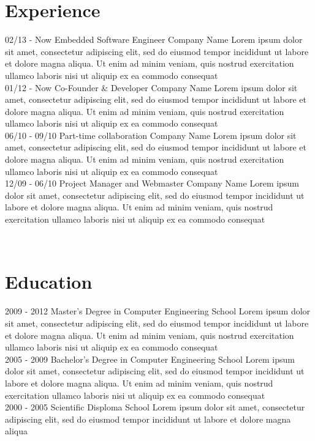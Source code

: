 \documentclass[]{friggeri-cv}
\begin{document}
\section{Experience}
\begin{entrylist}
  \entry
    {02/13 - Now}
    {Embedded Software Engineer}
    {Company Name}
    {Lorem ipsum dolor sit amet, consectetur adipiscing elit, sed do eiusmod tempor incididunt ut labore et dolore magna aliqua. Ut enim ad minim veniam, quis nostrud exercitation ullamco laboris nisi ut aliquip ex ea commodo consequat\\}
  \entry
    {01/12 - Now}
    {Co-Founder \& Developer}
    {Company Name}
    {Lorem ipsum dolor sit amet, consectetur adipiscing elit, sed do eiusmod tempor incididunt ut labore et dolore magna aliqua. Ut enim ad minim veniam, quis nostrud exercitation ullamco laboris nisi ut aliquip ex ea commodo consequat\\}
    \entry
    {06/10 - 09/10}
    {Part-time collaboration}
    {Company Name}
    {Lorem ipsum dolor sit amet, consectetur adipiscing elit, sed do eiusmod tempor incididunt ut labore et dolore magna aliqua. Ut enim ad minim veniam, quis nostrud exercitation ullamco laboris nisi ut aliquip ex ea commodo consequat\\}
    \entry
    {12/09 - 06/10}
    {Project Manager and Webmaster}
    {Company Name}
    {Lorem ipsum dolor sit amet, consectetur adipiscing elit, sed do eiusmod tempor incididunt ut labore et dolore magna aliqua. Ut enim ad minim veniam, quis nostrud exercitation ullamco laboris nisi ut aliquip ex ea commodo consequat}
\end{entrylist}
\\
\section{Education}
\begin{entrylist}
  \entry
    {2009 - 2012}
    {Master's Degree in Computer Engineering}
    {School}
    {Lorem ipsum dolor sit amet, consectetur adipiscing elit, sed do eiusmod tempor incididunt ut labore et dolore magna aliqua. Ut enim ad minim veniam, quis nostrud exercitation ullamco laboris nisi ut aliquip ex ea commodo consequat\\}
  \entry
    {2005 - 2009}
    {Bachelor's Degree in Computer Engineering}
    {School}
    {Lorem ipsum dolor sit amet, consectetur adipiscing elit, sed do eiusmod tempor incididunt ut labore et dolore magna aliqua. Ut enim ad minim veniam, quis nostrud exercitation ullamco laboris nisi ut aliquip ex ea commodo consequat\\}
  \entry
    {2000 - 2005}
    {Scientific Disploma}
    {School}
    {Lorem ipsum dolor sit amet, consectetur adipiscing elit, sed do eiusmod tempor incididunt ut labore et dolore magna aliqua}
\end{entrylist}
\end{document}
